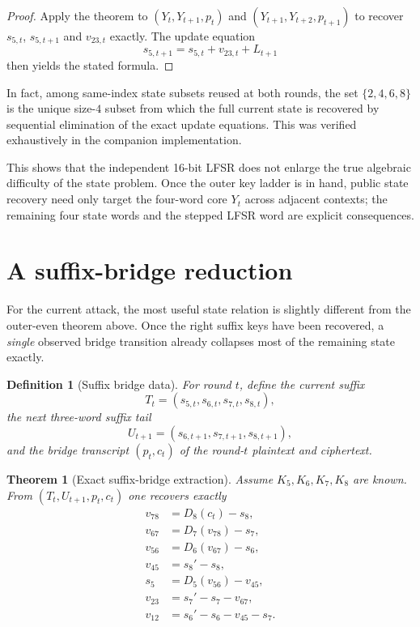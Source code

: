 \documentclass[11pt]{article}
\newtheorem{theorem}{Theorem}
\newtheorem{definition}{Definition}
\begin{document}
\begin{proof}
Apply the theorem to $(Y_t,Y_{t+1},p_t)$ and $(Y_{t+1},Y_{t+2},p_{t+1})$ to recover $s_{5,t}$, $s_{5,t+1}$ and $v_{23,t}$ exactly. The update equation
\[
s_{5,t+1}=s_{5,t}+v_{23,t}+L_{t+1}
\]
then yields the stated formula.
\end{proof}

In fact, among same-index state subsets reused at both rounds, the set $\{2,4,6,8\}$ is the unique size-$4$ subset from which the full current state is recovered by sequential elimination of the exact update equations. This was verified exhaustively in the companion implementation.

This shows that the independent 16-bit LFSR does not enlarge the true algebraic difficulty of the state problem. Once the outer key ladder is in hand, public state recovery need only target the four-word core $Y_t$ across adjacent contexts; the remaining four state words and the stepped LFSR word are explicit consequences.

\section{A suffix-bridge reduction}
For the current attack, the most useful state relation is slightly different from the outer-even theorem above. Once the right suffix keys have been recovered, a \emph{single} observed bridge transition already collapses most of the remaining state exactly.

\begin{definition}[Suffix bridge data]
For round $t$, define the current suffix
\[
T_t=(s_{5,t},s_{6,t},s_{7,t},s_{8,t}),
\]
the next three-word suffix tail
\[
U_{t+1}=(s_{6,t+1},s_{7,t+1},s_{8,t+1}),
\]
and the bridge transcript $(p_t,c_t)$ of the round-$t$ plaintext and ciphertext.
\end{definition}

\begin{theorem}[Exact suffix-bridge extraction]
Assume $K_5,K_6,K_7,K_8$ are known. From $(T_t,U_{t+1},p_t,c_t)$ one recovers exactly
\begin{align*}
v_{78} &= D_8(c_t)-s_8,\\
v_{67} &= D_7(v_{78})-s_7,\\
v_{56} &= D_6(v_{67})-s_6,\\
v_{45} &= s_8'-s_8,\\
s_5 &= D_5(v_{56})-v_{45},\\
v_{23} &= s_7'-s_7-v_{67},\\
v_{12} &= s_6'-s_6-v_{45}-s_7.
\end{align*}
\end{theorem}
\end{document}
